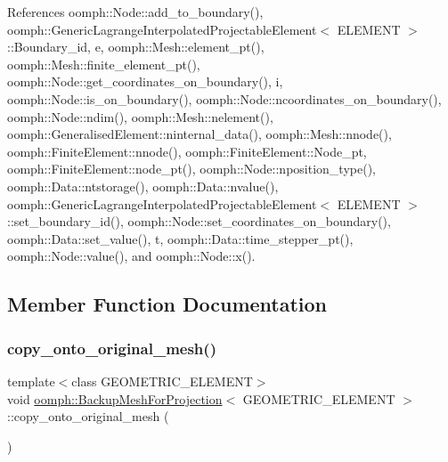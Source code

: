 References oomph\+::\+Node\+::add\+\_\+to\+\_\+boundary(), oomph\+::\+Generic\+Lagrange\+Interpolated\+Projectable\+Element$<$ E\+L\+E\+M\+E\+N\+T $>$\+::\+Boundary\+\_\+id, e, oomph\+::\+Mesh\+::element\+\_\+pt(), oomph\+::\+Mesh\+::finite\+\_\+element\+\_\+pt(), oomph\+::\+Node\+::get\+\_\+coordinates\+\_\+on\+\_\+boundary(), i, oomph\+::\+Node\+::is\+\_\+on\+\_\+boundary(), oomph\+::\+Node\+::ncoordinates\+\_\+on\+\_\+boundary(), oomph\+::\+Node\+::ndim(), oomph\+::\+Mesh\+::nelement(), oomph\+::\+Generalised\+Element\+::ninternal\+\_\+data(), oomph\+::\+Mesh\+::nnode(), oomph\+::\+Finite\+Element\+::nnode(), oomph\+::\+Finite\+Element\+::\+Node\+\_\+pt, oomph\+::\+Finite\+Element\+::node\+\_\+pt(), oomph\+::\+Node\+::nposition\+\_\+type(), oomph\+::\+Data\+::ntstorage(), oomph\+::\+Data\+::nvalue(), oomph\+::\+Generic\+Lagrange\+Interpolated\+Projectable\+Element$<$ E\+L\+E\+M\+E\+N\+T $>$\+::set\+\_\+boundary\+\_\+id(), oomph\+::\+Node\+::set\+\_\+coordinates\+\_\+on\+\_\+boundary(), oomph\+::\+Data\+::set\+\_\+value(), t, oomph\+::\+Data\+::time\+\_\+stepper\+\_\+pt(), oomph\+::\+Node\+::value(), and oomph\+::\+Node\+::x().



\subsection{Member Function Documentation}
\mbox{\label{classoomph_1_1BackupMeshForProjection_a228c554024e2651071bc0e1282641e1f}} 
\subsubsection{\texorpdfstring{copy\+\_\+onto\+\_\+original\+\_\+mesh()}{copy\_onto\_original\_mesh()}}
{\footnotesize\ttfamily template$<$class G\+E\+O\+M\+E\+T\+R\+I\+C\+\_\+\+E\+L\+E\+M\+E\+NT$>$ \\
void \hyperlink{classoomph_1_1BackupMeshForProjection}{oomph\+::\+Backup\+Mesh\+For\+Projection}$<$ G\+E\+O\+M\+E\+T\+R\+I\+C\+\_\+\+E\+L\+E\+M\+E\+NT $>$\+::copy\+\_\+onto\+\_\+original\+\_\+mesh (\begin{DoxyParamCaption}{ }\end{DoxyParamCaption})\hspace{0.3cm}{\ttfamily [inline]}}



